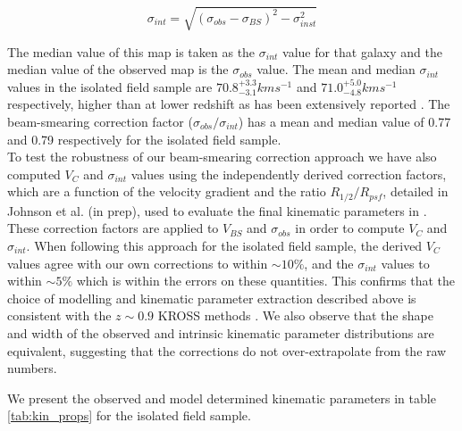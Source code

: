 \documentclass[fleqn,usenatbib]{mn2e}
\begin{document}
\begin{equation}\label{eq:owen_sigma}
   \sigma_{int} = \sqrt{\left(\sigma_{obs} - \sigma_{BS} \right)^{2} - \sigma_{inst}^{2}}
\end{equation}

The median value of this map is taken as the $\sigma_{int}$ value for that galaxy and the median value of the observed map is the $\sigma_{obs}$ value.
The mean and median $\sigma_{int}$ values in the isolated field sample are $70.8^{+3.3}_{-3.1} kms^{-1}$ and $71.0^{+5.0}_{-4.8} kms^{-1}$ respectively, higher than at lower redshift as has been extensively reported \citep[e.g.][]{Genzel2006,Genzel2008,ForsterSchreiber2009,Law2009,Gnerucci2011,Epinat2012,Wisnioski2015}.
The beam-smearing correction factor ($\sigma_{obs}/\sigma_{int}$) has a mean and median value of 0.77 and 0.79 respectively for the isolated field sample. \\

To test the robustness of our beam-smearing correction approach we have also computed $V_{C}$ and $\sigma_{int}$ values using the independently derived correction factors, which are a function of the velocity gradient and the ratio $R_{1/2}/R_{psf}$, detailed in Johnson et al. (in prep), used to evaluate the final kinematic parameters in \cite{Harrison2017}.
These correction factors are applied to $V_{BS}$ and $\sigma_{obs}$ in order to compute $V_{C}$ and $\sigma_{int}$.
When following this approach for the isolated field sample, the derived $V_{C}$ values agree with our own corrections to within $\sim10\%$, and the $\sigma_{int}$ values to within $\sim5\%$ which is within the errors on these quantities. 
This confirms that the choice of modelling and kinematic parameter extraction described above is consistent with the $z\sim0.9$ KROSS methods \citep{Harrison2017}.
We also observe that the shape and width of the observed and intrinsic kinematic parameter distributions are equivalent, suggesting that the corrections do not over-extrapolate from the raw numbers.

We present the observed and model determined kinematic parameters in table \ref{tab:kin_props} for the isolated field sample.
\end{document}
